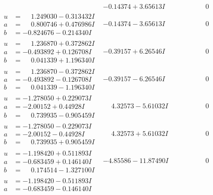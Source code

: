 \documentclass[1p]{elsarticle_modified}
\theoremstyle{definition}
\begin{document}
$$\begin{array}{c|c|c}
 & -0.14374 + 3.65613 I & \phantom{-0.000000 } 0 \\ \hline\begin{aligned}
u &= \phantom{-}1.249030 - 0.313432 I \\
a &= \phantom{-}0.800746 + 0.476986 I \\
b &= -0.824676 - 0.214340 I\end{aligned}
 & -0.14374 - 3.65613 I & \phantom{-0.000000 } 0 \\ \hline\begin{aligned}
u &= \phantom{-}1.236870 + 0.372862 I \\
a &= -0.493892 + 0.126708 I \\
b &= \phantom{-}0.041339 + 1.196340 I\end{aligned}
 & -0.39157 + 6.26546 I & \phantom{-0.000000 } 0 \\ \hline\begin{aligned}
u &= \phantom{-}1.236870 - 0.372862 I \\
a &= -0.493892 - 0.126708 I \\
b &= \phantom{-}0.041339 - 1.196340 I\end{aligned}
 & -0.39157 - 6.26546 I & \phantom{-0.000000 } 0 \\ \hline\begin{aligned}
u &= -1.278050 + 0.229073 I \\
a &= -2.00152 + 0.44928 I \\
b &= \phantom{-}0.739935 - 0.905459 I\end{aligned}
 & \phantom{-}4.32573 - 5.61032 I & \phantom{-0.000000 } 0 \\ \hline\begin{aligned}
u &= -1.278050 - 0.229073 I \\
a &= -2.00152 - 0.44928 I \\
b &= \phantom{-}0.739935 + 0.905459 I\end{aligned}
 & \phantom{-}4.32573 + 5.61032 I & \phantom{-0.000000 } 0 \\ \hline\begin{aligned}
u &= -1.198420 + 0.511893 I \\
a &= -0.683459 + 0.146140 I \\
b &= \phantom{-}0.174514 - 1.327100 I\end{aligned}
 & -4.85586 - 11.87490 I & \phantom{-0.000000 } 0 \\ \hline\begin{aligned}
u &= -1.198420 - 0.511893 I \\
a &= -0.683459 - 0.146140 I \\

\end{aligned}
\end{array}$$
\end{document}
